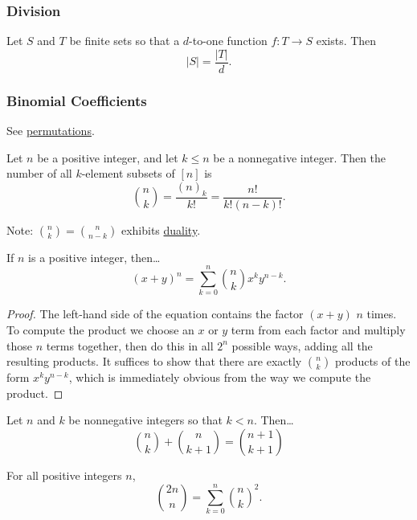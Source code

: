 \subsubsection{Division}\label{division}

\begin{theorem}
Let $S$ and $T$ be finite sets so that a $d$-to-one function $f : T \rightarrow S$ exists. Then
$$|S| = \frac{|T|}{d}.$$
\end{theorem}

\subsubsection{Binomial Coefficients}\label{binomials}

See \hyperref[permutation]{permutations}.

\begin{theorem}\label{countingsubsets}
Let $n$ be a positive integer, and let $k \leq n$ be a nonnegative integer. Then the number of all $k$-element subsets of $[n]$ is
$${n \choose k} = \frac{(n)_k}{k!} = \frac{n!}{k!(n-k)!}.$$
\end{theorem}

Note: ${n \choose k} = {n \choose n-k}$ exhibits \hyperref[duality]{duality}.

\begin{theorem}\label{binomialtheorem}
If $n$ is a positive integer, then\dots
$$(x+y)^n = \sum_{k=0}^n {n \choose k} x^k y^{n-k}.$$ 
\end{theorem}

\begin{proof}
The left-hand side of the equation contains the factor $(x + y)$ $n$ times. To compute the product we choose an $x$ or $y$ term from each factor and multiply those $n$ terms together, then do this
in all $2^n$ possible ways, adding all the resulting products. It suffices to show that there are exactly ${n \choose k}$ products of the form $x^k y^{n-k}$, which is immediately obvious from the
way we compute the product.
\end{proof}

\begin{theorem}
Let $n$ and $k$ be nonnegative integers so that $k < n.$ Then\dots
$${n \choose k} + {n \choose k + 1} = {n + 1 \choose k + 1}$$
\end{theorem}

\begin{theorem}
For all positive integers $n$,
$${2n \choose n} = \sum^n_{k=0}{n \choose k}^2.$$
\end{theorem}

